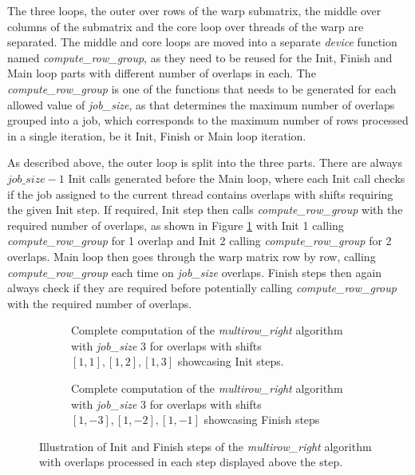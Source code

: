 The three loops, the outer over rows of the warp submatrix, the middle over columns of the submatrix and the core loop over threads of the warp are separated. The middle and core loops are moved into a separate \textit{device} function named \textit{compute\_row\_group}, as they need to be reused for the Init, Finish and Main loop parts with different number of overlaps in each. The \textit{compute\_row\_group} is one of the functions that needs to be generated for each allowed value of \textit{job\_size}, as that determines the maximum number of overlaps grouped into a job, which corresponds to the maximum number of rows processed in a single iteration, be it Init, Finish or Main loop iteration. 

As described above, the outer loop is split into the three parts. There are always $job\_size - 1$ Init calls generated before the Main loop, where each Init call checks if the job assigned to the current thread contains overlaps with shifts requiring the given Init step. If required, Init step then calls \textit{compute\_row\_group} with the required number of overlaps, as shown in Figure \ref{fig:multirow_init} with Init 1 calling \textit{compute\_row\_group} for 1 overlap and Init 2 calling \textit{compute\_row\_group} for 2 overlaps. Main loop then goes through the warp matrix row by row, calling \textit{compute\_row\_group} each time on \textit{job\_size} overlaps. Finish steps then again always check if they are required before potentially calling \textit{compute\_row\_group} with the required number of overlaps.




\begin{figure}[ht]
	\centering	
	\begin{subfigure}{\textwidth}
		\centering
		\def\svgwidth{\textwidth}
		
		\caption{Complete computation of the \textit{multirow\_right} algorithm with \textit{job\_size} 3 for overlaps with shifts $[1, 1], [1, 2], [1, 3]$ showcasing Init steps.}
		\label{fig:multirow_init}
	\end{subfigure}
	\hfill
	\begin{subfigure}{\textwidth}
		\centering
		\def\svgwidth{\textwidth}
		
		\caption{Complete computation of the \textit{multirow\_right} algorithm with \textit{job\_size} 3 for overlaps with shifts $[1, -3], [1, -2], [1, -1]$ showcasing Finish steps}
		\label{fig:multirow_fini}
	\end{subfigure}
	
	\caption{Illustration of Init and Finish steps of the \textit{multirow\_right} algorithm with overlaps processed in each step displayed above the step.}
	\label{fig:multirow_right_steps}
\end{figure}



